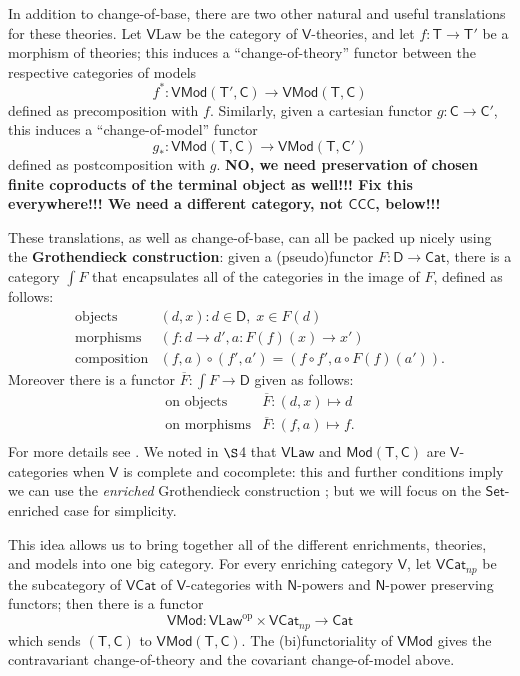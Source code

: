 \documentclass{amsart}
\theoremstyle{definition}
\newcommand{\Set}{\mathsf{Set}}
\newcommand{\Cat}{\mathsf{Cat}}
\newcommand{\Law}{\mathsf{Law}}
\newcommand{\CCC}{\mathsf{CCC}}
\newcommand{\Mod}{\mathsf{Mod}}
\newcommand{\NN}{\mathsf{N}}
\newcommand{\V}{\mathsf{V}}
\newcommand{\D}{\mathsf{D}}
\newcommand{\C}{\mathsf{C}}
\newcommand{\T}{\mathsf{T}}
\newcommand{\op}{\mathrm{op}}
\newcommand{\maps}{\colon}
\begin{document}
In addition to change-of-base, there are two other natural and useful translations for these theories. Let $\V\mathrm{Law}$ be the category of $\V$-theories, and let $f\maps\T\to \T'$ be a morphism of theories; this induces a ``change-of-theory'' functor between the respective categories of models $$f^*\maps\V\Mod(\T',\C)\to \V\Mod(\T,\C)$$ defined as precomposition with $f$. Similarly, given a cartesian functor $g\maps \C \to \C'$, this induces a ``change-of-model'' functor $$g_*\maps\V\Mod(\T,\C) \to \V\Mod(\T,\C')$$ defined as postcomposition with $g$.   \textbf{NO, we need preservation of chosen finite coproducts of the terminal object as well!!!  Fix this everywhere!!!  We need a different category, not $\CCC$, below!!!}

These translations, as well as change-of-base, can all be packed up nicely using the \textbf{Grothendieck construction}: given a (pseudo)functor $F\maps \D \to \Cat$, there is a category $\int F$ that encapsulates all of the categories in the image of $F$, defined
as follows:
\[\begin{array}{rl}
\text{objects} & (d,x) \colon d\in \D, \; x\in F(d)\\
\text{morphisms} & (f\maps d\to d',a\maps F(f)(x)\to x')\\
\text{composition} & (f,a) \circ (f',a') = (f \circ f', a \circ F(f)(a')).
\end{array}\]
Moreover there is a functor $\overline{F} \maps \int F \to \D$ given as follows:
\[\begin{array}{rl}
\text{on objects} & \overline{F} \maps (d,x) \mapsto d \\
\text{on morphisms} & \overline{F} \maps (f,a) \mapsto f .\\
\end{array}\]
For more details see \cite{borceux,jacobs}.  We noted in $\S$4 that $\V\Law$ and $\Mod(\T,\C)$ are $\V$-categories when $\V$ is complete and cocomplete: this and further conditions imply we can use the \textit{enriched} Grothendieck construction \cite{beardsleywong}; but we will focus on the $\Set$-enriched case for simplicity. 

This idea allows us to bring together all of the different enrichments, theories, and models into one big category. For every enriching category $\V$, let $\V\Cat_{np}$ be the subcategory of $\V\Cat$ of $\V$-categories with $\NN$-powers and $\NN$-power preserving functors; then there is a functor $$\V\Mod\maps \V\Law^\op \times \V\Cat_{np} \to \Cat$$ which sends $(\T,\C)$ to $\V\Mod(\T,\C)$. The (bi)functoriality of $\V\Mod$ gives the contravariant change-of-theory and the covariant change-of-model above.
\end{document}
